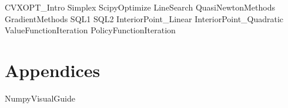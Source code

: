 \documentclass[opener-c,labs,red,nociteref]{HJnewsiambook}
\begin{document}
{CVXOPT_Intro}
{Simplex}
{ScipyOptimize}
{LineSearch}
{QuasiNewtonMethods}
{GradientMethods}
{SQL1}
{SQL2}
{InteriorPoint_Linear}
{InteriorPoint_Quadratic}
{ValueFunctionIteration}
{PolicyFunctionIteration}

\part{Appendices}
\begin{appendices}
{NumpyVisualGuide}
\end{appendices}
\end{document}
